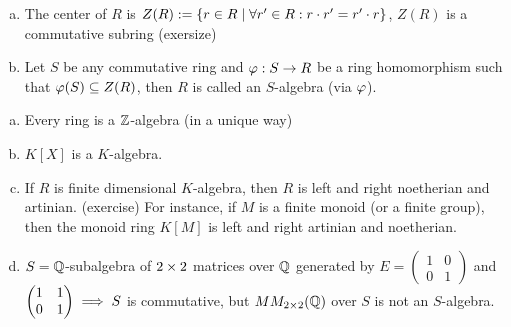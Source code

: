 \documentclass[a4paper]{report}
\begin{document}
\begin{defi}
\begin{enumerate}[(a)]
  \item The center of $R$ is $Z(R) := \{r \in R \mid \forall r' \in R: r \cdot r' = r' \cdot r\}$, $Z(R)$ is a commutative subring (exersize)
  \item Let $S$ be any commutative ring and $\varphi: S \to R$ be a ring homomorphism such that $\varphi(S) \subseteq Z(R)$, then $R$ is called an $S$-algebra (via $\varphi$).
\end{enumerate}
\end{defi}


\begin{exmps*}
  \begin{enumerate}[(a)]
  \item Every ring is a $\Z$-algebra (in a unique way)
    \item $K[X]$ is a $K$-algebra.
    \item If $R$ is finite dimensional $K$-algebra, then $R$ is left and right noetherian and artinian. (exercise) For instance, if $M$ is a finite monoid (or a finite group), then the monoid ring $K[M]$ is left and right artinian and noetherian.
          \item $S = \Q$-subalgebra of $2 \tm 2$ matrices over $\Q$ generated by $E = \begin{pmatrix} 1 & 0 \\ 0 & 1

          \end{pmatrix}$ and $\begin{pmatrix} 1 & 1 \\ 0 & 1
          \end{pmatrix} \imp S$ is commutative, but $MM_{2\tm 2}(\Q)$ over $S$ is not an $S$-algebra.
  \end{enumerate}
\end{exmps*}
\end{document}
